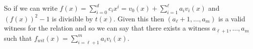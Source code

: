So if we can write $f(x) = \sum_{i=0}^d c_i x^i = v_0(x) + \sum_{i=1}^\ell a_i v_i(x)$ and $(f(x))^2 - 1$ is divisible by $t(x)$. Given this then $(a_\ell+1, \dots, a_m)$ is a valid witness for the relation and so we can say that there exists a witness $a_{\ell+1}, \dots, a_m$ such that $f_{wit}(x) = \sum_{i=\ell+1}^m a_i v_i(x)$.